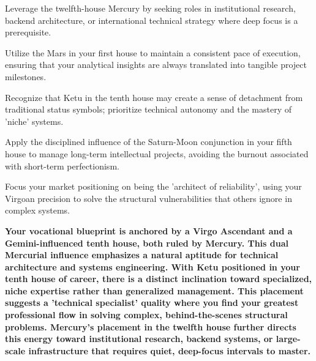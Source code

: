 \begin{diamondlist}
  \item {\fontsize{8.5}{12}\selectfont Leverage the twelfth-house Mercury by seeking roles in institutional research, backend architecture, or international technical strategy where deep focus is a prerequisite.}
  \item {\fontsize{8.5}{12}\selectfont Utilize the Mars in your first house to maintain a consistent pace of execution, ensuring that your analytical insights are always translated into tangible project milestones.}
  \item {\fontsize{8.5}{12}\selectfont Recognize that Ketu in the tenth house may create a sense of detachment from traditional status symbols; prioritize technical autonomy and the mastery of 'niche' systems.}
  \item {\fontsize{8.5}{12}\selectfont Apply the disciplined influence of the Saturn-Moon conjunction in your fifth house to manage long-term intellectual projects, avoiding the burnout associated with short-term perfectionism.}
  \item {\fontsize{8.5}{12}\selectfont Focus your market positioning on being the 'architect of reliability', using your Virgoan precision to solve the structural vulnerabilities that others ignore in complex systems.}
\end{diamondlist}


\label{topic67}

{\fontsize{9.5}{13.8}\selectfont\bfseries\color{DeepSlate} Your vocational blueprint is anchored by a Virgo Ascendant and a Gemini-influenced tenth house, both ruled by Mercury. This dual Mercurial influence emphasizes a natural aptitude for technical architecture and systems engineering. With Ketu positioned in your tenth house of career, there is a distinct inclination toward specialized, niche expertise rather than generalized management. This placement suggests a 'technical specialist' quality where you find your greatest professional flow in solving complex, behind-the-scenes structural problems. Mercury's placement in the twelfth house further directs this energy toward institutional research, backend systems, or large-scale infrastructure that requires quiet, deep-focus intervals to master.}\par\vspace{2mm}

